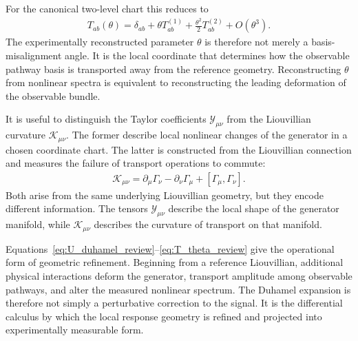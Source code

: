 For the canonical two-level chart this reduces to
\begin{align}
T_{ab}(\theta)
=
\delta_{ab}
+
\theta T^{(1)}_{ab}
+
\frac{\theta^2}{2}
T^{(2)}_{ab}
+
O(\theta^3).
\label{eq:T_theta_review}
\end{align}
The experimentally reconstructed parameter \(\theta\) is therefore
not merely a basis-misalignment angle. It is the local coordinate
that determines how the observable pathway basis is transported
away from the reference geometry. Reconstructing \(\theta\) from
nonlinear spectra is equivalent to reconstructing the leading
deformation of the observable bundle.

It is useful to distinguish the Taylor coefficients
\(\mathcal Y_{\mu\nu}\) from the Liouvillian curvature
\(\mathcal K_{\mu\nu}\). The former describe local nonlinear
changes of the generator in a chosen coordinate chart. The latter
is constructed from the Liouvillian connection and measures the
failure of transport operations to commute:
\begin{align}
\mathcal K_{\mu\nu}
=
\partial_\mu\Gamma_\nu
-
\partial_\nu\Gamma_\mu
+
[\Gamma_\mu,\Gamma_\nu].
\end{align}
Both arise from the same underlying Liouvillian geometry, but
they encode different information. The tensors
\(\mathcal Y_{\mu\nu}\) describe the local shape of the generator
manifold, while \(\mathcal K_{\mu\nu}\) describes the curvature
of transport on that manifold.

Equations~\eqref{eq:U_duhamel_review}--\eqref{eq:T_theta_review}
give the operational form of geometric refinement. Beginning from
a reference Liouvillian, additional physical interactions deform
the generator, transport amplitude among observable pathways, and
alter the measured nonlinear spectrum. The Duhamel expansion is
therefore not simply a perturbative correction to the signal. It
is the differential calculus by which the local response geometry
is refined and projected into experimentally measurable form.

